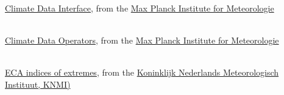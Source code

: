 \begin{thebibliography}{xx}


 \ \\
  \href{https://code.zmaw.de/projects/cdi}
       {Climate Data Interface},
  from the
  \href{http://www.mpimet.mpg.de}
       {Max Planck Institute for Meteorologie}


 \ \\
  \href{https://code.zmaw.de/projects/cdo}
       {Climate Data Operators},
  from the
  \href{http://www.mpimet.mpg.de}
       {Max Planck Institute for Meteorologie}


 \ \\
  \href{http://eca.knmi.nl/indicesextremes/}
       {ECA indices of extremes},
  from the
  \href{http://knmi.nl/}
       {Koninklijk Nederlands Meteorologisch Instituut, KNMI)}


\end{thebibliography}
